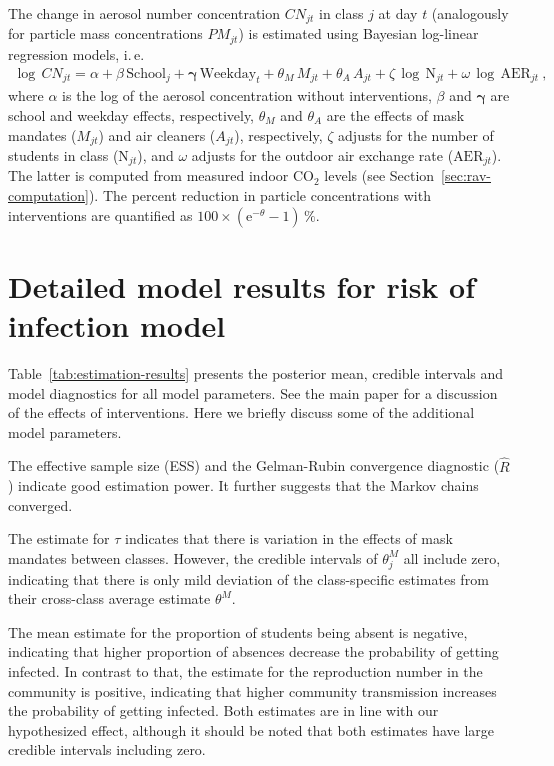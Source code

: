 \documentclass[fleqn,11pt]{wlscirep_supp}
\newcommand\ie{i.\,e.\xspace}
\begin{document}
The change in aerosol number concentration $CN_{jt}$ in class $j$ at day $t$ (analogously for particle mass concentrations $PM_{jt}$) is estimated using Bayesian log-linear regression models, \ie
\begin{align}
    \log\,CN_{jt} = \alpha + \beta\,\textrm{School}_j + \bm{\gamma}\,\textrm{Weekday}_t + \theta_M\,M_{jt} + \theta_A\,A_{jt} + \zeta\,\log\,\textrm{N}_{jt} + \omega\,\log\,\textrm{AER}_{jt}~, 
\end{align}
where $\alpha$ is the log of the aerosol concentration without interventions, $\beta$ and $\bm{\gamma}$ are school and weekday effects, respectively, $\theta_M$ and $\theta_A$ are the effects of mask mandates ($M_{jt}$) and air cleaners ($A_{jt}$), respectively, $\zeta$ adjusts for the number of students in class ($\textrm{N}_{jt}$), and $\omega$ adjusts for the outdoor air exchange rate ($\textrm{AER}_{jt}$). The latter is computed from measured indoor CO$_2$ levels (see Section~\ref{sec:rav-computation}). The percent reduction in particle concentrations with interventions are quantified as $100 \times (\mathrm{e}^{-\theta} - 1)\,\%$.

\clearpage

\section{Detailed model results for risk of infection model}\label{sec:detailed-redcap}

Table~\ref{tab:estimation-results} presents the posterior mean, credible intervals and model diagnostics for all model parameters. See the main paper for a discussion of the effects of interventions. Here we briefly discuss some of the additional model parameters.

The effective sample size (ESS) and the Gelman-Rubin convergence diagnostic ($\hat{R}$) indicate good estimation power. It further suggests that the Markov chains converged.

The estimate for $\tau$ indicates that there is variation in the effects of mask mandates between classes. However, the credible intervals of $\theta_j^M$ all include zero, indicating that there is only mild deviation of the class-specific estimates from their cross-class average estimate $\theta^M$.   

The mean estimate for the proportion of students being absent is negative, indicating that higher proportion of absences decrease the probability of getting infected. In contrast to that, the estimate for the reproduction number in the community is positive, indicating that higher community transmission increases the probability of getting infected. Both estimates are in line with our hypothesized effect, although it should be noted that both estimates have large credible intervals including zero.
\end{document}
